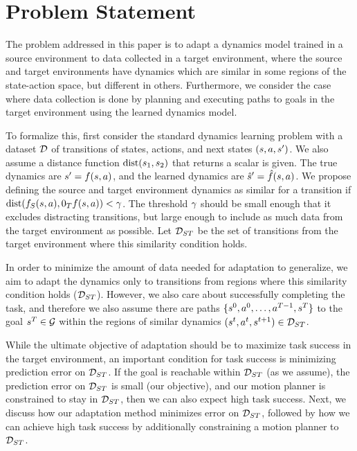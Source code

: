 \section{Problem Statement} \label{ICRA:sec:problem_statement}

The problem addressed in this paper is to adapt a dynamics model trained in a source environment to data collected in a target environment, where the source and target environments have dynamics which are similar in some regions of the state-action space, but different in others. Furthermore, we consider the case where data collection is done by planning and executing paths to goals in the target environment using the learned dynamics model.

To formalize this, first consider the standard dynamics learning problem with a dataset $\mathcal{D}$ of transitions of states, actions, and next states $(s,a,s')$. We also assume a distance function $\mathrm{dist}(s_1,s_2)$ that returns a scalar is given. The true dynamics are $s'=f(s,a)$, and the learned dynamics are $\hat{s}'=\hat{f}(s,a)$. We propose defining the source and target environment dynamics as similar for a transition if $\distf{\sourceDynamics(\state,\action)}{\targetDynamics(\state,\action)} < \softFilteringThrehsold$. The threshold $\gamma$ should be small enough that it excludes distracting transitions, but large enough to include as much data from the target environment as possible. Let $\mathcal{D}_{ST}$ be the set of transitions from the target environment where this similarity condition holds.

In order to minimize the amount of data needed for adaptation to generalize, we aim to adapt the dynamics only to transitions from regions where this similarity condition holds ($\mathcal{D}_{ST}$). However, we also care about successfully completing the task, and therefore we also assume there are paths $\{s^0,a^0,\dots,a^{T-1},s^T\}$ to the goal $s^T\in\mathcal{G}$ within the regions of similar dynamics $(s^t,a^t,s^{t+1}) \in \mathcal{D}_{ST} $.

While the ultimate objective of adaptation should be to maximize task success in the target environment, an important condition for task success is minimizing prediction error on $\mathcal{D}_{ST}$. If the goal is reachable within $\mathcal{D}_{ST}$ (as we assume), the prediction error on $\mathcal{D}_{ST}$ is small (our objective), and our motion planner is constrained to stay in $\mathcal{D}_{ST}$, then we can also expect high task success. Next, we discuss how our adaptation method minimizes error on $\mathcal{D}_{ST}$, followed by how we can achieve high task success by additionally constraining a motion planner to $\mathcal{D}_{ST}$.

